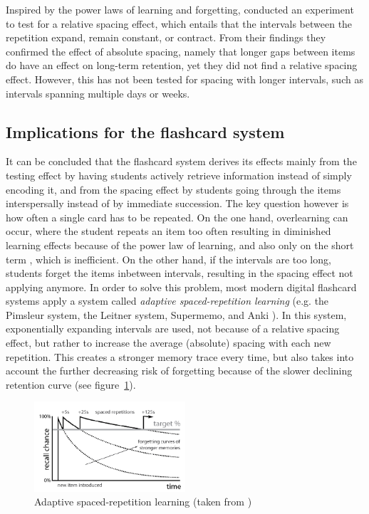 Inspired by the power laws of learning and forgetting,  conducted an experiment to test for a relative spacing effect, which entails that the intervals between the repetition expand, remain constant, or contract. From their findings they confirmed the effect of absolute spacing, namely that longer gaps between items do have an effect on long-term retention, yet they did not find a relative spacing effect. However, this has not been tested for spacing with longer intervals, such as intervals spanning multiple days or weeks.

\subsection{Implications for the flashcard system}

\label{subsec:implicationsflashcards}

It can be concluded that the flashcard system derives its effects mainly from the testing effect by having students actively retrieve information instead of simply encoding it, and from the spacing effect by students going through the items interspersally instead of by immediate succession. The key question however is how often a single card has to be repeated. On the one hand, overlearning can occur, where the student repeats an item too often resulting in diminished learning effects because of the power law of learning, and also only on the short term \cite{rohrer}, which is inefficient. On the other hand, if the intervals are too long, students forget the items inbetween intervals, resulting in the spacing effect not applying anymore. In order to solve this problem, most modern digital flashcard systems apply a system called \emph{adaptive spaced-repetition learning} (e.g. the Pimsleur system, the Leitner system, Supermemo, and Anki \cite{microlearning}). In this system, exponentially expanding intervals are used, not because of a relative spacing effect, but rather to increase the average (absolute) spacing with each new repetition. This creates a stronger memory trace every time, but also takes into account the further decreasing risk of forgetting because of the slower declining retention curve (see figure~\ref{fig:spacedrepetition}).

\begin{figure}
    \centering
    \includegraphics[width=0.5\textwidth]{img/spacedrepetition}
    \caption{Adaptive spaced-repetition learning (taken from \protect{})}
    \label{fig:spacedrepetition}
\end{figure}

